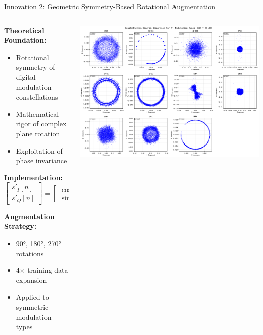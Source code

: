 \documentclass[aspectratio=169]{beamer}
\begin{document}
\begin{frame}{Innovation 2: Geometric Symmetry-Based Rotational Augmentation}
\begin{columns}
\begin{column}{0.5\textwidth}
\textbf{Theoretical Foundation:}
\begin{itemize}
\item Rotational symmetry of digital modulation constellations
\item Mathematical rigor of complex plane rotation
\item Exploitation of phase invariance
\end{itemize}

\textbf{Implementation:}
\begin{equation}
\begin{bmatrix} s'_I[n] \\ s'_Q[n] \end{bmatrix} = \begin{bmatrix} \cos\theta & -\sin\theta \\ \sin\theta & \cos\theta \end{bmatrix} \begin{bmatrix} s_I[n] \\ s_Q[n] \end{bmatrix}
\end{equation}

\textbf{Augmentation Strategy:}
\begin{itemize}
\item 90°, 180°, 270° rotations
\item 4× training data expansion
\item Applied to symmetric modulation types
\end{itemize}
\end{column}
\begin{column}{0.5\textwidth}
\includegraphics[width=\textwidth]{figure/constellation.png}
\end{column}
\end{columns}
\end{frame}
\end{document}
